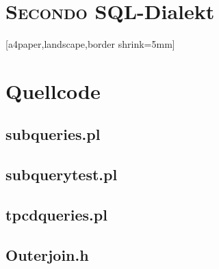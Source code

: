 %
% 
%
\label{Anhang}


\chapter{\textsc{Secondo} SQL-Dialekt}\label{apd:Secondo SQL-Dialekt}

%
%

\newpage

[a4paper,landscape,border shrink=5mm]
  \chapter{Quellcode}
  \section{subqueries.pl}
  
  \newpage
  \section{subquerytest.pl}
  
  \newpage
  \section{tpcdqueries.pl}
  
  \newpage
  \section{Outerjoin.h}
  
%  

%

%
%
%